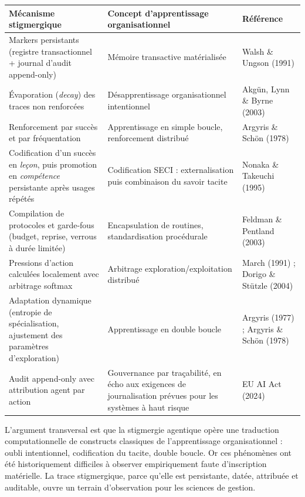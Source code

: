 \documentclass[12pt,a4paper]{article}
\begin{document}
\begin{table}[h]
\centering
\small
\begin{tabularx}{\textwidth}{L{4.5cm} L{4.5cm} L{3.5cm}}
\toprule
\textbf{Mécanisme stigmergique} & \textbf{Concept d'apprentissage organisationnel} & \textbf{Référence} \\
\midrule
Markers persistants (registre transactionnel + journal d'audit append-only) & Mémoire transactive matérialisée & Walsh \& Ungson (1991) \\
\addlinespace
Évaporation (\textit{decay}) des traces non renforcées & Désapprentissage organisationnel intentionnel & Akgün, Lynn \& Byrne (2003) \\
\addlinespace
Renforcement par succès et par fréquentation & Apprentissage en simple boucle, renforcement distribué & Argyris \& Schön (1978) \\
\addlinespace
Codification d'un succès en \textit{leçon}, puis promotion en \textit{compétence} persistante après usages répétés & Codification SECI : externalisation puis combinaison du savoir tacite & Nonaka \& Takeuchi (1995) \\
\addlinespace
Compilation de protocoles et garde-fous (budget, reprise, verrous à durée limitée) & Encapsulation de routines, standardisation procédurale & Feldman \& Pentland (2003) \\
\addlinespace
Pressions d'action calculées localement avec arbitrage softmax & Arbitrage exploration/exploitation distribué & March (1991) ; Dorigo \& Stützle (2004) \\
\addlinespace
Adaptation dynamique (entropie de spécialisation, ajustement des paramètres d'exploration) & Apprentissage en double boucle & Argyris (1977) ; Argyris \& Schön (1978) \\
\addlinespace
Audit append-only avec attribution agent par action & Gouvernance par traçabilité, en écho aux exigences de journalisation prévues pour les systèmes à haut risque & EU AI Act (2024) \\
\bottomrule
\end{tabularx}
\end{table}

L'argument transversal est que la stigmergie agentique opère une traduction computationnelle de constructs classiques de l'apprentissage organisationnel : oubli intentionnel, codification du tacite, double boucle. Or ces phénomènes ont été historiquement difficiles à observer empiriquement faute d'inscription matérielle. La trace stigmergique, parce qu'elle est persistante, datée, attribuée et auditable, ouvre un terrain d'observation pour les sciences de gestion.
\end{document}
